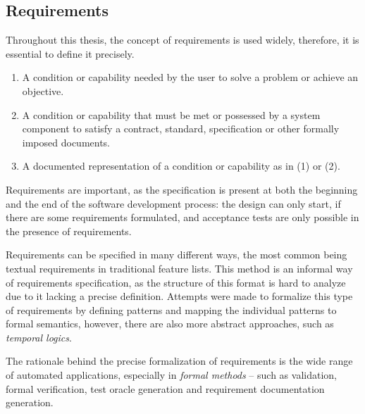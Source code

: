 \subsection{Requirements} \label{subs_backgrreq}

Throughout this thesis, the concept of requirements is used widely, therefore, it is essential to define it precisely. 

\begin{definition}
	\mbox{}
	\begin{enumerate}
		\setlength\itemsep{0.1em}
		\item A condition or capability needed by the user to solve a problem or achieve an objective.
		\item A condition or capability that must be met or possessed by a system component to satisfy a contract, standard, specification or other formally imposed documents.
		\item A documented representation of a condition or capability as in (1) or (2).
	\end{enumerate}
\end{definition}

Requirements are important, as the specification is present at both the beginning and the end of the software development process: the design can only start, if there are some requirements formulated, and acceptance tests are only possible in the presence of requirements.

Requirements can be specified in many different ways, the most common being textual requirements in traditional feature lists. This method is an informal way of requirements specification, as the structure of this format is hard to analyze due to it lacking a precise definition. Attempts were made to formalize this type of requirements by defining patterns and mapping the individual patterns to formal semantics, however, there are also more abstract approaches, such as \textit{temporal logics}. 

The rationale behind the precise formalization of requirements is the wide range of automated applications, especially in \textit{formal methods} -- such as validation, formal verification, test oracle generation and requirement documentation generation.


